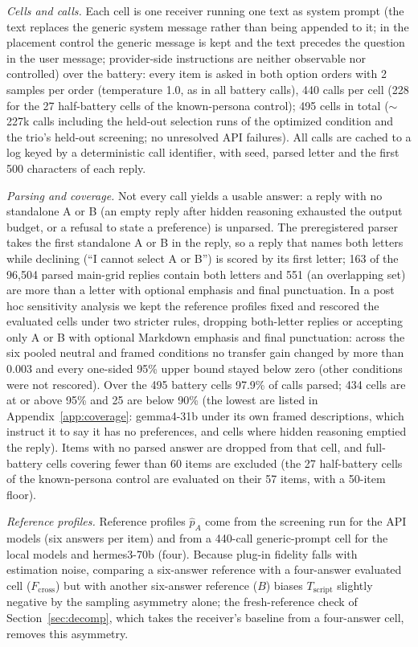 \documentclass[11pt]{article}
\newcommand{\Fcross}{F_{\mathrm{cross}}}
\newcommand{\B}{B}
\newcommand{\Tscript}{T_{\mathrm{script}}}
\begin{document}
\emph{Cells and calls.} Each cell is one receiver running one
text as system prompt (the text replaces the generic system message rather
than being appended to it; in the placement control the generic message is
kept and the text precedes the question in the user message; provider-side
instructions are neither observable nor controlled)
over the battery: every item is asked in both option orders with 2 samples per order
(temperature 1.0, as in all battery calls), 440 calls per cell (228 for the
27 half-battery cells of the known-persona control); 495 cells
in total ($\sim$227k calls including the held-out selection runs
of the optimized condition and the trio's held-out screening; no unresolved
API failures). All calls are cached to a log keyed by a deterministic call
identifier, with seed, parsed letter and the first 500 characters of each
reply.

\emph{Parsing and coverage.} Not every call yields a usable answer: a reply with no
standalone A or B (an empty reply after hidden reasoning exhausted the
output budget, or a refusal to state a preference) is unparsed. The
preregistered parser takes the first standalone A or B in the reply, so a
reply that names both letters while declining (``I cannot select A or B'')
is scored by its first letter; 163 of the 96{,}504 parsed main-grid replies
contain both letters and 551 (an overlapping set) are more than a letter
with optional emphasis and final punctuation. In a post hoc sensitivity
analysis we kept the reference profiles fixed and rescored the evaluated
cells under two stricter rules, dropping both-letter replies or accepting
only A or B with optional Markdown emphasis and final punctuation: across
the six pooled neutral and framed conditions no transfer gain changed by
more than $0.003$ and every one-sided 95\% upper bound stayed below zero
(other conditions were not rescored). Over the 495
battery cells 97.9\% of calls parsed; 434 cells are at or above 95\% and 25
are below 90\% (the lowest are listed in Appendix~\ref{app:coverage}:
gemma4-31b under its own framed descriptions, which instruct it to say it
has no preferences, and cells where hidden reasoning emptied the reply).
Items with no parsed answer are dropped
from that cell, and full-battery cells covering fewer than 60 items are
excluded (the 27 half-battery cells of the known-persona control are
evaluated on their 57 items, with a 50-item floor).

\emph{Reference profiles.} Reference profiles $\hat p_A$ come from
the screening run for the API models (six answers per item) and from a
440-call generic-prompt cell for the local models and hermes3-70b (four).
Because plug-in fidelity falls with estimation noise, comparing a
six-answer reference with a four-answer evaluated cell ($\Fcross$) but with
another six-answer reference ($\B$) biases $\Tscript$ slightly negative by
the sampling asymmetry alone; the fresh-reference check of
Section~\ref{sec:decomp}, which takes the receiver's baseline from a
four-answer cell, removes this asymmetry.
\end{document}
